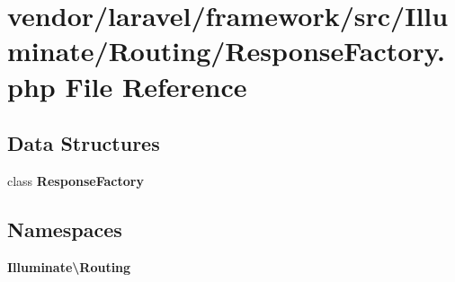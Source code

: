 \section{vendor/laravel/framework/src/\+Illuminate/\+Routing/\+Response\+Factory.php File Reference}
\label{_routing_2_response_factory_8php}
\subsection*{Data Structures}
\begin{DoxyCompactItemize}
\item 
class {\bf Response\+Factory}
\end{DoxyCompactItemize}
\subsection*{Namespaces}
\begin{DoxyCompactItemize}
\item 
 {\bf Illuminate\textbackslash{}\+Routing}
\end{DoxyCompactItemize}

